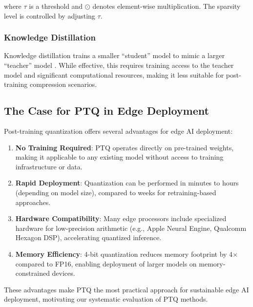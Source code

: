 \documentclass[11pt,a4paper]{article}
\begin{document}
where $\tau$ is a threshold and $\odot$ denotes element-wise multiplication. The sparsity level is controlled by adjusting $\tau$.

\subsubsection{Knowledge Distillation}

Knowledge distillation trains a smaller ``student'' model to mimic a larger ``teacher'' model \cite{hinton2015distilling}. While effective, this requires training access to the teacher model and significant computational resources, making it less suitable for post-training compression scenarios.

\subsection{The Case for PTQ in Edge Deployment}

Post-training quantization offers several advantages for edge AI deployment:

\begin{enumerate}[leftmargin=*,nosep]
    \item \textbf{No Training Required}: PTQ operates directly on pre-trained weights, making it applicable to any existing model without access to training infrastructure or data.
    
    \item \textbf{Rapid Deployment}: Quantization can be performed in minutes to hours (depending on model size), compared to weeks for retraining-based approaches.
    
    \item \textbf{Hardware Compatibility}: Many edge processors include specialized hardware for low-precision arithmetic (e.g., Apple Neural Engine, Qualcomm Hexagon DSP), accelerating quantized inference.
    
    \item \textbf{Memory Efficiency}: 4-bit quantization reduces memory footprint by 4$\times$ compared to FP16, enabling deployment of larger models on memory-constrained devices.
\end{enumerate}

These advantages make PTQ the most practical approach for sustainable edge AI deployment, motivating our systematic evaluation of PTQ methods.

\end{document}
